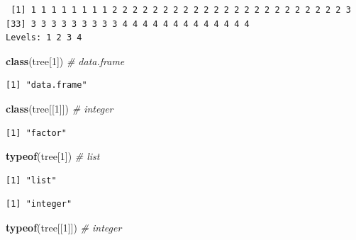 \documentclass[]{book}
\newenvironment{Shaded}{\begin{snugshade}}{\end{snugshade}}
\newcommand{\CommentTok}[1]{\textcolor[rgb]{0.56,0.35,0.01}{\textit{#1}}}
\newcommand{\DecValTok}[1]{\textcolor[rgb]{0.00,0.00,0.81}{#1}}
\newcommand{\KeywordTok}[1]{\textcolor[rgb]{0.13,0.29,0.53}{\textbf{#1}}}
\newcommand{\NormalTok}[1]{#1}
\newcommand{\OperatorTok}[1]{\textcolor[rgb]{0.81,0.36,0.00}{\textbf{#1}}}
\theoremstyle{definition}
\theoremstyle{definition}
\theoremstyle{definition}
\theoremstyle{remark}
\begin{document}
\begin{verbatim}
 [1] 1 1 1 1 1 1 1 1 2 2 2 2 2 2 2 2 2 2 2 2 2 2 2 2 2 2 2 2 2 2 2 3
[33] 3 3 3 3 3 3 3 3 3 4 4 4 4 4 4 4 4 4 4 4 4 4
Levels: 1 2 3 4
\end{verbatim}

\begin{Shaded}
\begin{Highlighting}[]
\KeywordTok{class}\NormalTok{(tree[}\DecValTok{1}\NormalTok{]) }\CommentTok{# data.frame}
\end{Highlighting}
\end{Shaded}

\begin{verbatim}
[1] "data.frame"
\end{verbatim}

\begin{Shaded}
\begin{Highlighting}[]
\KeywordTok{class}\NormalTok{(tree[[}\DecValTok{1}\NormalTok{]]) }\CommentTok{# integer}
\end{Highlighting}
\end{Shaded}

\begin{verbatim}
[1] "factor"
\end{verbatim}

\begin{Shaded}
\begin{Highlighting}[]
\KeywordTok{typeof}\NormalTok{(tree[}\DecValTok{1}\NormalTok{]) }\CommentTok{# list}
\end{Highlighting}
\end{Shaded}

\begin{verbatim}
[1] "list"
\end{verbatim}

\begin{Shaded}
\end{Shaded}

\begin{verbatim}
[1] "integer"
\end{verbatim}

\begin{Shaded}
\begin{Highlighting}[]
\KeywordTok{typeof}\NormalTok{(tree[[}\DecValTok{1}\NormalTok{]]) }\CommentTok{# integer}
\end{Highlighting}
\end{Shaded}
\end{document}
